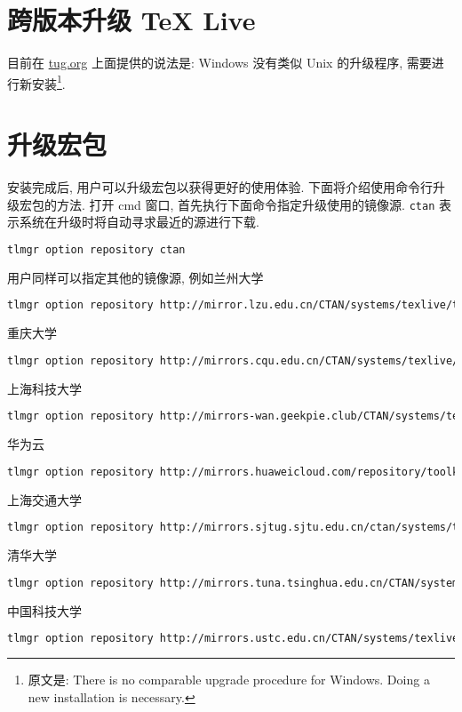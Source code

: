 \documentclass{ctexrep}
\begin{document}
\section{跨版本升级 \TeX{} Live}
目前在 \href{https://www.tug.org/texlive/upgrade.html}{tug.org} 上面提供的说法是:
Windows 没有类似 Unix 的升级程序,
需要进行新安装\footnote{原文是: There is no comparable upgrade procedure for Windows. Doing a new installation is necessary.}.

\section{升级宏包}
安装完成后, 用户可以升级宏包以获得更好的使用体验. 
下面将介绍使用命令行升级宏包的方法. 
打开 \textsf{cmd} 窗口, 首先执行下面命令指定升级使用的镜像源. 
\texttt{ctan} 表示系统在升级时将自动寻求最近的源进行下载. 
\begin{lstlisting}[language=bash]
  tlmgr option repository ctan
\end{lstlisting}
用户同样可以指定其他的镜像源, 例如兰州大学
\begin{lstlisting}[language=bash]
  tlmgr option repository http://mirror.lzu.edu.cn/CTAN/systems/texlive/tlnet
\end{lstlisting}
重庆大学
\begin{lstlisting}[language=bash]
  tlmgr option repository http://mirrors.cqu.edu.cn/CTAN/systems/texlive/tlnet
\end{lstlisting}
上海科技大学
\begin{lstlisting}[language=bash]
  tlmgr option repository http://mirrors-wan.geekpie.club/CTAN/systems/texlive/tlnet
\end{lstlisting}
华为云
\begin{lstlisting}[language=bash]
  tlmgr option repository http://mirrors.huaweicloud.com/repository/toolkit/CTAN/systems/texlive/tlnet
\end{lstlisting}
上海交通大学
\begin{lstlisting}[language=bash]
  tlmgr option repository http://mirrors.sjtug.sjtu.edu.cn/ctan/systems/texlive/tlnet
\end{lstlisting}
清华大学
\begin{lstlisting}[language=bash]
  tlmgr option repository http://mirrors.tuna.tsinghua.edu.cn/CTAN/systems/texlive/tlnet
\end{lstlisting}
中国科技大学
\begin{lstlisting}[language=bash]
  tlmgr option repository http://mirrors.ustc.edu.cn/CTAN/systems/texlive/tlnet
\end{lstlisting}
\end{document}

